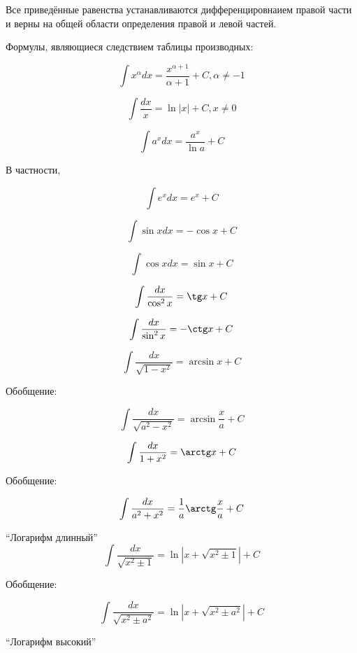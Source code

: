Все приведённые равенства устанавливаются дифференцировнаием правой части и верны на общей области определения правой и левой частей.

Формулы, являющиеся следствием таблицы производных:

\begin{list}{.}{}

\item
$$
\int x^\alpha dx= \frac{x^{\alpha+1}}{\alpha+1}+C, \alpha \neq -1
$$

\item
$$
\int \frac{dx}{x}= \ln|x|+C, x\neq 0
$$

\item
$$
\int a^x dx= \frac{a^x}{\ln a}+C
$$

В частности,

$$
\int e^x dx= e^x +C
$$

\item
$$
\int \sin x dx= -\cos x+C
$$

\item
$$
\int \cos x dx= \sin x+C
$$

\item
$$
\int \frac{dx}{\cos^2 x}= \tg x +C
$$

\item
$$
\int \frac{dx}{\sin^2 x}= -\ctg x +C
$$

\item
$$
\int \frac{dx}{\sqrt{1-x^2}}= \arcsin x+C
$$

Обобщение:

$$
\int \frac{dx}{\sqrt{a^2-x^2}}= \arcsin \frac{x}{a}+C
$$

\item
$$
\int \frac{dx}{1+x^2}= \arctg x+C
$$

Обобщение:

$$
\int \frac{dx}{a^2+x^2}= \frac{1}{a} \arctg \frac{x}{a}+C
$$


\item

``Логарифм длинный''
$$
\int \frac{dx}{\sqrt{x^2 \pm 1}}= \ln|x+\sqrt{x^2 \pm 1}|+C
$$

Обобщение:

$$
\int \frac{dx}{\sqrt{x^2 \pm a^2}}= \ln|x+\sqrt{x^2 \pm a^2}|+C
$$

\item

``Логарифм высокий''


\end{list}
